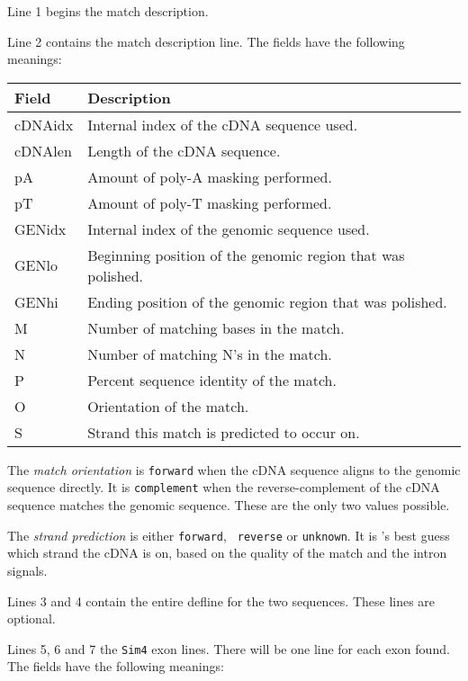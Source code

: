 \documentclass[twoside,11pt]{book}
\begin{document}
Line 1 begins the match description.

Line 2 contains the match description line.  The fields have the following meanings:

\begin{tabular}{|l|l|}
\hline
Field   & Description \\
\hline
\hline
cDNAidx & Internal index of the cDNA sequence used. \\
cDNAlen & Length of the cDNA sequence. \\
pA      & Amount of poly-A masking performed. \\
pT      & Amount of poly-T masking performed. \\
GENidx  & Internal index of the genomic sequence used. \\
GENlo   & Beginning position of the genomic region that was polished. \\
GENhi   & Ending position of the genomic region that was polished. \\
M       & Number of matching bases in the match. \\
N       & Number of matching N's in the match. \\
P       & Percent sequence identity of the match. \\
O       & Orientation of the match. \\
S       & Strand this match is predicted to occur on. \\
\hline
\end{tabular}


The {\it match orientation} is {\tt forward} when the cDNA sequence
aligns to the genomic sequence directly.  It is {\tt complement} when
the reverse-complement of the cDNA sequence matches the genomic
sequence.  These are the only two values possible.

The {\it strand prediction} is either {\tt forward}, {\tt
reverse} or {\tt unknown}.  It is \ESTmapper's best guess which strand
the cDNA is on, based on the quality of the match and the intron
signals.

Lines 3 and 4 contain the entire defline for the two sequences.  These lines are
optional.

Lines 5, 6 and 7 the {\tt Sim4} exon lines.  There will be one line
for each exon found.  The fields have the following meanings:
\end{document}
